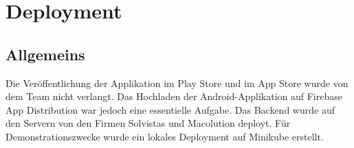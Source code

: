 \section{Deployment}

\subsection{Allgemeins}

Die Veröffentlichung der Applikation im Play Store und im App Store wurde von dem Team nicht verlangt. 
Das Hochladen der Android-Applikation auf Firebase App Distribution war jedoch eine essentielle Aufgabe.
Das Backend wurde auf den Servern von den Firmen Solvistas und Macolution deployt. Für Demonstrationszwecke wurde ein lokales Deployment auf Minikube erstellt.







